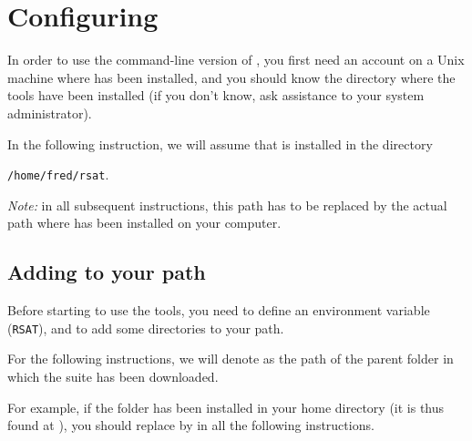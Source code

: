 \section{Configuring \RSAT}


In order to use the command-line version of \RSAT, you first need an
account on a Unix machine where \RSAT has been installed, and you
should know the directory where the tools have been installed (if you
don't know, ask assistance to your system administrator).

In the following instruction, we will assume that \RSAT is installed
in the directory 

\texttt{/home/fred/rsat}. 

\emph{Note:} in all subsequent instructions, this path has to be
replaced by the actual path where \RSAT has been installed on your
computer.

\subsection{Adding \RSAT  to your path}

Before starting to use the tools, you need to define an environment
variable (\texttt{RSAT}), and to add some directories to your path.

For the following instructions, we will denote as
 the path of the parent folder in which
the \RSAT suite has been downloaded.

For example, if the  folder has been installed in your home
directory (it is thus found at ), you should
replace  by  in all the
following instructions.


